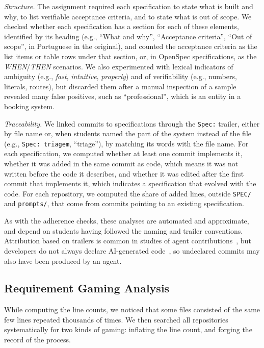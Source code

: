 \documentclass[conference]{IEEEtran}
\begin{document}
\emph{Structure.} The assignment required each specification to state what is built and why, to list verifiable acceptance criteria, and to state what is out of scope. We checked whether each specification has a section for each of these elements, identified by its heading (e.g., ``What and why'', ``Acceptance criteria'', ``Out of scope'', in Portuguese in the original), and counted the acceptance criteria as the list items or table rows under that section, or, in OpenSpec specifications, as the \emph{WHEN}/\emph{THEN} scenarios. We also experimented with lexical indicators of ambiguity (e.g., \emph{fast}, \emph{intuitive}, \emph{properly}) and of verifiability (e.g., numbers, literals, routes), but discarded them after a manual inspection of a sample revealed many false positives, such as ``professional'', which is an entity in a booking system.

\emph{Traceability.} We linked commits to specifications through the \texttt{Spec:} trailer, either by file name or, when students named the part of the system instead of the file (e.g., \texttt{Spec: triagem}, ``triage''), by matching its words with the file name. For each specification, we computed whether at least one commit implements it, whether it was added in the same commit as code, which means it was not written before the code it describes, and whether it was edited after the first commit that implements it, which indicates a specification that evolved with the code. For each repository, we computed the share of added lines, outside \texttt{SPEC/} and \texttt{prompts/}, that come from commits pointing to an existing specification.

As with the adherence checks, these analyses are automated and approximate, and depend on students having followed the naming and trailer conventions. Attribution based on trailers is common in studies of agent contributions~\cite{li2026aidev,zi2025agentpack}, but developers do not always declare AI-generated code~\cite{kashif2026selfdeclaration}, so undeclared commits may also have been produced by an agent.

\subsection{Requirement Gaming Analysis}
\label{sec:gaming-method}

While computing the line counts, we noticed that some files consisted of the same few lines repeated thousands of times. We then searched all repositories systematically for two kinds of gaming: inflating the line count, and forging the record of the process.
\end{document}
